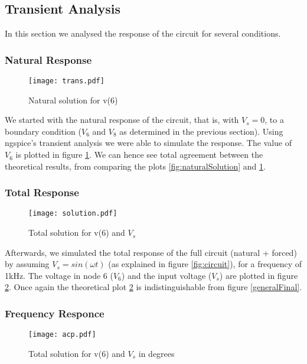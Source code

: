 \subsection{Transient Analysis}

In this section we analysed the response of the circuit for several
conditions.

\subsubsection{Natural Response}

\begin{figure}[h] \centering
  \texttt{[image: trans.pdf]}
  \caption{Natural solution for v(6)}
  \label{fig:sol_nat_spice}
\end{figure}

We started with the natural response of the circuit, that is, 
with $V_s=0$, to a boundary condition ($V_6$ and $V_8$ as determined 
in the previous section).
Using ngspice's transient analysis we were able to simulate the response. 
The value of $V_6$ is plotted in figure \ref{fig:sol_nat_spice}.
We can hence see total agreement between the theoretical results, 
from comparing the plots \ref{fig:naturalSolution} and 
\ref{fig:sol_nat_spice}.

\subsubsection{Total Response}

\begin{figure}[h] \centering
  \texttt{[image: solution.pdf]}
  \caption{Total solution for v(6) and $V_s$}
  \label{fig:sol_tot_spice}
\end{figure}

Afterwards, we simulated the total response of the full circuit (natural 
+ forced) by assuming $V_s = sin(\omega t)$ (as explained in figure \ref{fig:circuit}), 
for a frequency of 1kHz.
The voltage in node 6 ($V_6$) and the input voltage ($V_s$) are plotted 
in figure \ref{fig:sol_tot_spice}. 
Once again the theoretical plot \ref{fig:sol_tot_spice} is 
indistinguishable from figure \ref{generalFinal}.


\subsubsection{Frequency Responce}

\begin{figure}[h] \centering
  \texttt{[image: acp.pdf]}
  \caption{Total solution for v(6) and $V_s$ in degrees}
  \label{phase_spice}
\end{figure}

